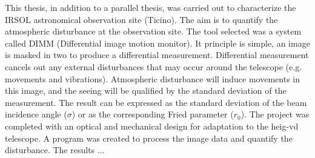 
This thesis, in addition to a parallel thesis, was carried out to characterize the IRSOL astronomical observation site (Ticino).
The aim is to quantify the atmospheric disturbance at the observation site. \newline
The tool selected was a system called DIMM (Differential image motion monitor).
It principle is simple, an image is masked in two to produce a differential measurement.\newline
Differential measurement cancels out any external disturbances that may occur around the telescope (e.g. movements and vibrations).
\bigbreak
Atmospheric disturbance will induce movements in this image, and the seeing will be qualified by the standard deviation of the measurement.
The result can be expressed as the standard deviation of the beam incidence angle ($\sigma$) or as the corresponding Fried parameter ($r_0$).
\bigbreak
The project was completed with an optical and mechanical design for adaptation to the \Gls{heig-vd} telescope.
A program was created to process the image data and quantify the disturbance. \newline
The results ...